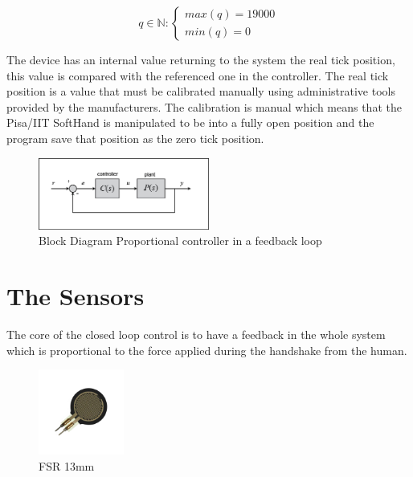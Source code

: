 \begin{equation}
q \in \mathbb{N} : \left\{\begin{matrix}
max(q) = 19000 \\ 
min(q) = 0
\end{matrix}\right.
\label{EQ:qlimits}
\end{equation}

The device has an internal value returning to the system the real tick position, this value is compared with the referenced one in the controller. The real tick position is a value that must be calibrated manually using administrative tools provided by the manufacturers. 
The calibration is manual which means that the Pisa/IIT SoftHand is manipulated to be into a fully open position and the program save that position as the zero tick position.

\begin{figure}[h]
\centering
\includegraphics[width=0.5\textwidth]{Figure/feedbackP.png}
\caption{Block Diagram Proportional controller in a feedback loop}
\label{Fig:Pr}
\end{figure}


\section{The Sensors}
The core of the closed loop control is to have a feedback in the whole system which is proportional to the force applied during the handshake from the human. 
\begin{figure}
\centering
\includegraphics[width=0.25\textwidth]{Figure/fsrsingle1.png}
\caption{FSR 13mm}
\label{Fig:FSRsingle}
\end{figure}

